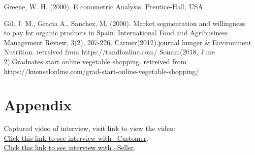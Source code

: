 \documentclass[12pt]{report}
\begin{document}
\begin{normalsize}
\begin{thebibliography}{99}			%
	
	Greene, W. H. (2000). E conometric Analysis. Prentice-Hall, USA. 
	
	 Gil, J. M., Gracia A., Sanchez, M. (2000). Market segmentation and willingness to pay for organic
    products in Spain. International Food and Agribusiness Management Review, 3(2), 207-226.
    Carmer(2012).journal hunger & Environment Nutrition. retreived from https://tandfonline.com/
    Sonam(2018, June 2).Graduates start online vegetable shopping. retreived from https://kuenselonline.com/grad-start-online-vegetable-shopping/
    
	

\end{thebibliography}



\newpage



\chapter*{Appendix}
Captured video of interview, visit link to view the video:
\newline\\[0.1cm]
\href{https://www.dropbox.com/s/zhjewbta4r5x05z/DSC_0437.MOV?dl=0}{Click this link to see interview with --Customer}.
\newline\\[0.1cm]
\href{https://www.dropbox.com/s/l2rd9ojg9kzjbfl/DSC_0457.MOV?dl=0}{Click this link to see interview with --Seller}.




\end{normalsize}
	
	
		
	
\end{document}
